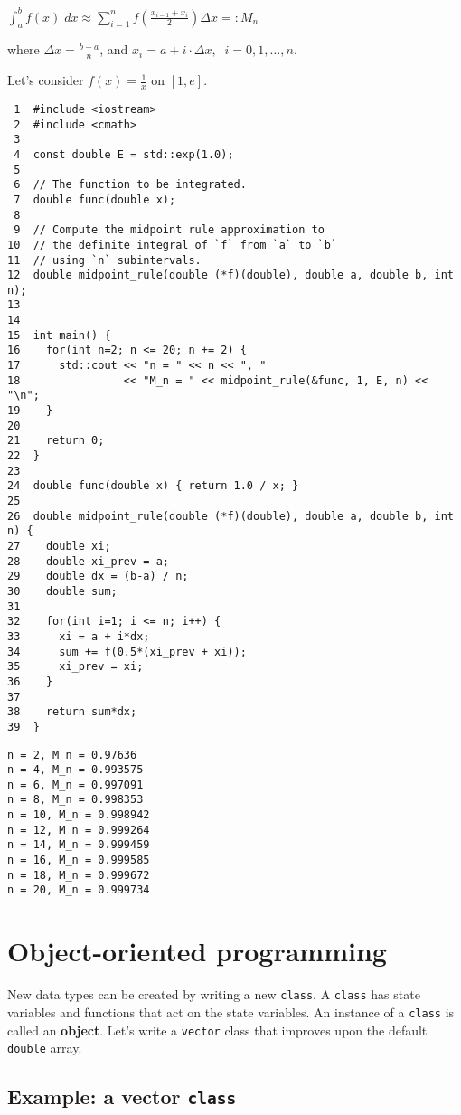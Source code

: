 \documentclass[11pt]{article}
\begin{document}
\(\int_a^b f(x) \; dx \approx \sum_{i=1}^n f\left( \frac{x_{i-1}+x_i}{2} \right) \Delta x =: M_n\)

where \(\Delta x = \frac{b-a}{n}\), and \(x_i = a + i \cdot \Delta x, \;\; i=0, 1, \ldots, n\).

Let's consider \(f(x) = \frac{1}{x}\) on \([1, e]\).

\begin{verbatim}
 1  #include <iostream>
 2  #include <cmath>
 3  
 4  const double E = std::exp(1.0);
 5  
 6  // The function to be integrated.
 7  double func(double x);
 8  
 9  // Compute the midpoint rule approximation to
10  // the definite integral of `f` from `a` to `b`
11  // using `n` subintervals.
12  double midpoint_rule(double (*f)(double), double a, double b, int n);
13  
14  
15  int main() {
16    for(int n=2; n <= 20; n += 2) {
17      std::cout << "n = " << n << ", "
18                << "M_n = " << midpoint_rule(&func, 1, E, n) << "\n";
19    }
20  
21    return 0;
22  }
23  
24  double func(double x) { return 1.0 / x; }
25  
26  double midpoint_rule(double (*f)(double), double a, double b, int n) {
27    double xi;
28    double xi_prev = a;
29    double dx = (b-a) / n;
30    double sum;
31  
32    for(int i=1; i <= n; i++) {
33      xi = a + i*dx;
34      sum += f(0.5*(xi_prev + xi));
35      xi_prev = xi;
36    }
37  
38    return sum*dx;
39  }
\end{verbatim}

\begin{verbatim}
n = 2, M_n = 0.97636
n = 4, M_n = 0.993575
n = 6, M_n = 0.997091
n = 8, M_n = 0.998353
n = 10, M_n = 0.998942
n = 12, M_n = 0.999264
n = 14, M_n = 0.999459
n = 16, M_n = 0.999585
n = 18, M_n = 0.999672
n = 20, M_n = 0.999734
\end{verbatim}

\section{Object-oriented programming}
\label{sec:orgheadline9}

New data types can be created by writing a new \texttt{class}. A \texttt{class} has 
state variables and functions that act on the state variables. An instance 
of a \texttt{class} is called an \textbf{object}. Let's write a \texttt{vector} class that 
improves upon the default \texttt{double} array.

\subsection{Example: a vector \texttt{class}}
\label{sec:orgheadline59}
\end{document}
